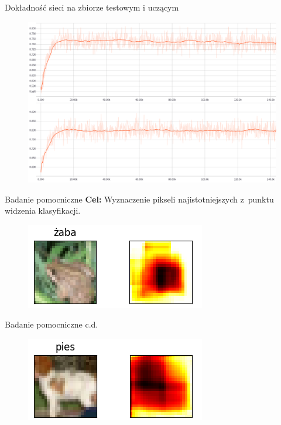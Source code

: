 \documentclass[xcolor=dvipsnames]{beamer}
\begin{document}
\begin{frame}{Dokładność sieci na zbiorze testowym i uczącym}
  \begin{figure}
    \includegraphics[width=\textwidth]{img/badanie_3.png}
  \end{figure}
\end{frame}
\begin{frame}{Badanie pomocniczne}
  \textbf{Cel:} Wyznaczenie pikseli najistotniejszych z~punktu widzenia klasyfikacji.
  \begin{figure}
    \includegraphics[width=\textwidth]{img/heatmap_1.png}
  \end{figure}
\end{frame}
\begin{frame}{Badanie pomocniczne c.d.}
  \begin{figure}
    \includegraphics[width=\textwidth]{img/heatmap_2.png}
  \end{figure}
\end{frame}
\end{document}
